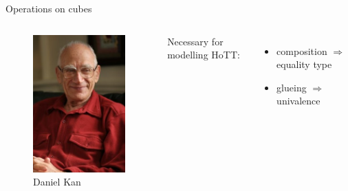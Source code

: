 \documentclass[english]{beamer}
\begin{document}
\begin{frame}{Operations on cubes}
 
\begin{columns}[c]
        \begin{center}
            \begin{figure}[h!]
                \includegraphics[height=.6\textheight]{figures/kan.jpg}
                \caption{Daniel Kan}
            \end{figure} 
        \end{center}
        
        Necessary for modelling HoTT:
        
        \begin{itemize}
         \item  composition $\Rightarrow$ equality type
         \item glueing $\Rightarrow$ univalence
        \end{itemize}



\end{columns}
\end{frame}
\end{document}
